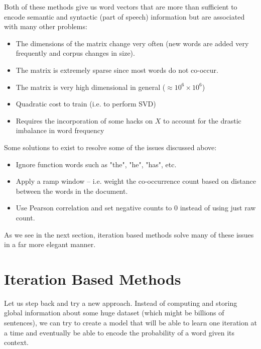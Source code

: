 \documentclass{tufte-handout}
\begin{document}
Both of these methods give us word vectors that are more than sufficient to encode semantic and syntactic (part of speech) information but are associated with many other problems:
\begin{itemize}
\item The dimensions of the matrix change very often (new words are added very frequently and corpus changes in size).
\item The matrix is extremely sparse since most words do not co-occur.
\item The matrix is very high dimensional in general ($\approx 10^6 \times 10^6$)
\item Quadratic cost to train (i.e. to perform SVD)
\item Requires the incorporation of some hacks on $X$ to account for the drastic imbalance in word frequency
\end{itemize}
Some solutions to exist to resolve some of the issues discussed above:
\begin{itemize}
\item Ignore function words such as "the", "he", "has", etc.
\item Apply a ramp window -- i.e. weight the co-occurrence count based on distance between the words in the document. 
\item Use Pearson correlation and set negative counts to 0 instead of using just raw count.
\end{itemize}

As we see in the next section, iteration based methods solve many of these issues in a far more elegant manner.

\section{Iteration Based Methods}\label{sec:itermethods}

Let us step back and try a new approach. Instead of computing and storing global information about some huge dataset (which might be billions of sentences), we can try to create a model that will be able to learn one iteration at a time and eventually be able to encode the probability of a word given its context. 

\end{document}
